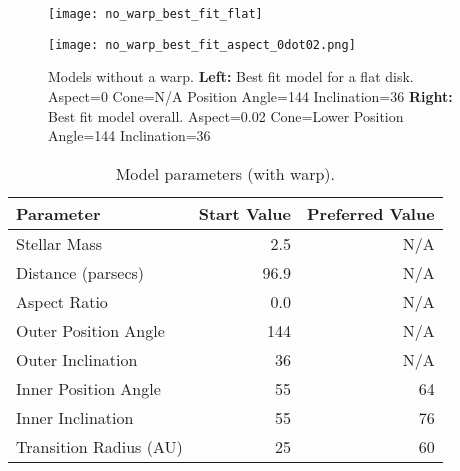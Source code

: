 \documentclass[a4paper]{tufte-handout}
\begin{document}
\begin{figure}[!p]
  \label{fig:no warp models}
  \centering
  \caption[No Warp Best Fit Models]{Models without a warp. \newline
  \noindent \textbf{Left:} Best fit model for a flat disk. \newline
     Aspect=0 \newline
     Cone=N/A \newline
     Position Angle=144 \newline
     Inclination=36 \newline
   \noindent \textbf{Right:} Best fit model overall. \newline
     Aspect=0.02 \newline
     Cone=Lower \newline
     Position Angle=144 \newline
     Inclination=36 \newline}
  \begin{minipage}{.5\textwidth}
    \texttt{[image: no\_warp\_best\_fit\_flat]}
  \end{minipage}%
  \begin{minipage}{.5\textwidth}
    \texttt{[image: no\_warp\_best\_fit\_aspect\_0dot02.png]}
  \end{minipage}
\end{figure}

\begin{table}[!p]
\label{tab:warp parameters}
\centering
\caption[Warp Model Parameters]{Model parameters (with warp). }
\begin{tabular}{lrr}
  \toprule
  Parameter 	        &	Start Value              &	 Preferred Value\\
  \midrule
  Stellar Mass              &	2.5 \citep{Manoj06}      &	N/A\\
  Distance (parsecs)        &	96.9 \citep{Meeus12}     &	N/A\\
  Aspect Ratio              &	0.0                      &	N/A\\
  Outer Position Angle      &	144                      &	N/A\\
  Outer Inclination         &	36                       &	N/A\\
  Inner Position Angle      &	55                       &	64\\
  Inner Inclination         &	55                       &	76\\
  Transition Radius (AU)    &	25                    &	60\\
\end{tabular}
\end{table}
\end{document}
